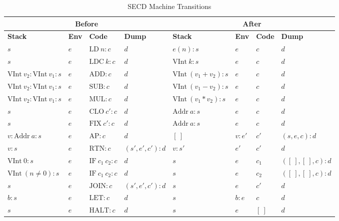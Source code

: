 \begin{table}[h]
    \centering
    \small
    \setlength{\tabcolsep}{4pt}
    \begin{tabular}{|l|l|l|l||l|l|l|l|}
        \hline
        \multicolumn{4}{|c||}{\textbf{Before}} & \multicolumn{4}{c|}{\textbf{After}} \\
        \hline
        \textbf{Stack} & \textbf{Env} & \textbf{Code} & \textbf{Dump} & \textbf{Stack} & \textbf{Env} & \textbf{Code} & \textbf{Dump} \\
        \hline
        \( s \) & \( e \) & \( \text{LD} \ n : c \) & \( d \) & \( e(n) : s \) & \( e \) & \( c \) & \( d \) \\
        \( s \) & \( e \) & \( \text{LDC} \ k : c \) & \( d \) & \( \text{VInt} \ k : s \) & \( e \) & \( c \) & \( d \) \\
        \( \text{VInt} \ v_2 : \text{VInt} \ v_1 : s \) & \( e \) & \( \text{ADD} : c \) & \( d \) & \( \text{VInt} \ (v_1 + v_2) : s \) & \( e \) & \( c \) & \( d \) \\
        \( \text{VInt} \ v_2 : \text{VInt} \ v_1 : s \) & \( e \) & \( \text{SUB} : c \) & \( d \) & \( \text{VInt} \ (v_1 - v_2) : s \) & \( e \) & \( c \) & \( d \) \\
        \( \text{VInt} \ v_2 : \text{VInt} \ v_1 : s \) & \( e \) & \( \text{MUL} : c \) & \( d \) & \( \text{VInt} \ (v_1 * v_2) : s \) & \( e \) & \( c \) & \( d \) \\
        \hline
        \( s \) & \( e \) & \( \text{CLO} \ c' : c \) & \( d \) & \( \text{Addr} \ a : s \) & \( e \) & \( c \) & \( d \) \\
        \( s \) & \( e \) & \( \text{FIX} \ c' : c \) & \( d \) & \( \text{Addr} \ a : s \) & \( e \) & \( c \) & \( d \) \\
        \( v : \text{Addr} \ a : s \) & \( e \) & \( \text{AP} : c \) & \( d \) & \( [ \ ] \) & \( v : e' \) & \( c' \) & \( (s, e, c) : d \) \\
        \( v : s \) & \( e \) & \( \text{RTN} : c \) & \( (s', e', c') : d \) & \( v : s' \) & \( e' \) & \( c' \) & \( d \) \\
        \hline
        \( \text{VInt} \ 0 : s \) & \( e \) & \( \text{IF} \ c_1 \ c_2 : c \) & \( d \) & \( s \) & \( e \) & \( c_1 \) & \( ([ \ ], [ \ ], c) : d \) \\
        \( \text{VInt} \ (n \neq 0) : s \) & \( e \) & \( \text{IF} \ c_1 \ c_2 : c \) & \( d \) & \( s \) & \( e \) & \( c_2 \) & \( ([\ ], [ \ ], c) : d \) \\
        \( s \) & \( e \) & \( \text{JOIN} : c \) & \( (s', e', c') : d \) & \( s \) & \( e \) & \( c' \) & \( d \) \\
        \( b : s \) & \( e \) & \( \text{LET} : c \) & \( d \) & \( s \) & \( b : e \) & \( c \) & \( d \) \\
        \( s \) & \( e \) & \( \text{HALT} : c \) & \( d \) & \( s \) & \( e \) & \( [ \ ] \) & \( d \) \\
        \hline
    \end{tabular}
    \caption{SECD Machine Transitions}
    \label{table:secd}
\end{table}

